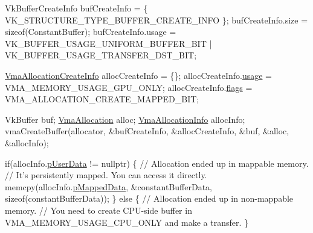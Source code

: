 \begin{DoxyCode}
VkBufferCreateInfo bufCreateInfo = \{ VK\_STRUCTURE\_TYPE\_BUFFER\_CREATE\_INFO \};
bufCreateInfo.size = \textcolor{keyword}{sizeof}(ConstantBuffer);
bufCreateInfo.usage = VK\_BUFFER\_USAGE\_UNIFORM\_BUFFER\_BIT | VK\_BUFFER\_USAGE\_TRANSFER\_DST\_BIT;

\hyperlink{structVmaAllocationCreateInfo}{VmaAllocationCreateInfo} allocCreateInfo = \{\};
allocCreateInfo.\hyperlink{structVmaAllocationCreateInfo_accb8b06b1f677d858cb9af20705fa910}{usage} = VMA\_MEMORY\_USAGE\_GPU\_ONLY;
allocCreateInfo.\hyperlink{structVmaAllocationCreateInfo_add09658ac14fe290ace25470ddd6d41b}{flags} = VMA\_ALLOCATION\_CREATE\_MAPPED\_BIT;

VkBuffer buf;
\hyperlink{structVmaAllocation}{VmaAllocation} alloc;
\hyperlink{structVmaAllocationInfo}{VmaAllocationInfo} allocInfo;
vmaCreateBuffer(allocator, &bufCreateInfo, &allocCreateInfo, &buf, &alloc, &allocInfo);

\textcolor{keywordflow}{if}(allocInfo.\hyperlink{structVmaAllocationInfo_adc507656149c04de7ed95d0042ba2a13}{pUserData} != \textcolor{keyword}{nullptr})
\{
    \textcolor{comment}{// Allocation ended up in mappable memory.}
    \textcolor{comment}{// It's persistently mapped. You can access it directly.}
    memcpy(allocInfo.\hyperlink{structVmaAllocationInfo_a5eeffbe2d2f30f53370ff14aefbadbe2}{pMappedData}, &constantBufferData, \textcolor{keyword}{sizeof}(constantBufferData));
\}
\textcolor{keywordflow}{else}
\{
    \textcolor{comment}{// Allocation ended up in non-mappable memory.}
    \textcolor{comment}{// You need to create CPU-side buffer in VMA\_MEMORY\_USAGE\_CPU\_ONLY and make a transfer.}
\}
\end{DoxyCode}
 